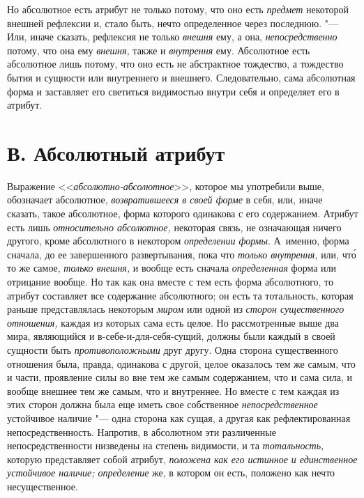 Но абсолютное есть атрибут не только потому, что оно есть
{\em предмет} некоторой внешней рефлексии и, стало
быть, нечто определенное через последнюю. "--- Или, иначе сказать, рефлексия
не только {\em внешня} ему, а она,
{\em непосредственно} потому, что она ему
{\em внешня,} также и
{\em внутрення} ему. Абсолютное есть абсолютное лишь
потому, что оно есть не абстрактное тождество, а тождество бытия и сущности
или внутреннего и внешнего. Следовательно, сама абсолютная форма и
заставляет его светиться видимостью внутри себя и определяет его в атрибут.


\section[В. Абсолютный атрибут]{В. Абсолютный атрибут}

Выражение <<{\em абсолютно-абсолютное}>>, которое мы употребили
выше, обозначает абсолютное, {\em возвратившееся в
своей форме} в себя, или, иначе сказать, такое абсолютное, форма которого
одинакова с его содержанием. Атрибут есть лишь
{\em относительно абсолютное,} некоторая связь, не
означающая ничего другого, кроме абсолютного в некотором
{\em определении формы}. А~именно, форма сначала, до ее
завершенного развертывания, пока что {\em только
внутрення,} или, чт\'{о} то же самое, {\em только внешня,}
и вообще есть сначала {\em определенная} форма или
отрицание вообще. Но так как она вместе с тем есть форма абсолютного, то
атрибут составляет все содержание абсолютного; он есть та тотальность,
которая раньше представлялась некоторым {\em миром} или
одной из {\em сторон существенного отношения,} каждая
из которых сама есть целое. Но рассмотренные выше два мира, являющийся и
в-себе-и-для-себя-сущий, должны были каждый в своей сущности быть
{\em противоположными} друг другу. Одна сторона
существенного отношения была, правда, одинакова с другой, целое оказалось
тем же самым, что и части, проявление силы во вне тем же самым содержанием,
что и сама сила, и вообще внешнее тем же самым, что и внутреннее. Но вместе
с тем каждая из этих сторон должна была еще иметь свое собственное
{\em непосредственное} устойчивое наличие "--- одна
сторона как сущая, а другая как рефлектированная непосредственность.
Напротив, в абсолютном эти различенные непосредственности низведены на
степень видимости, и та {\em тотальность,} которую
представляет собой атрибут, {\em положена как его
истинное и единственное устойчивое наличие; определение} же, в котором он
есть, положено как нечто несущественное.

